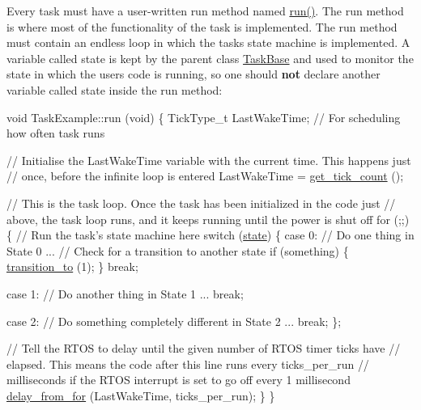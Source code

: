 Every task must have a user-\/written run method named {\ttfamily \mbox{\hyperlink{class_task_base_adcf6036ad9c860051ccf392ba5e7dbbc}{run()}}}. The run method is where most of the functionality of the task is implemented. The run method must contain an endless loop in which the task\textquotesingle{}s state machine is implemented. A variable called {\ttfamily state} is kept by the parent class {\ttfamily \mbox{\hyperlink{class_task_base}{Task\+Base}}} and used to monitor the state in which the user\textquotesingle{}s code is running, so one should {\bfseries not} declare another variable called {\ttfamily state} inside the run method\+: 
\begin{DoxyCode}
\textcolor{keywordtype}{void} TaskExample::run (\textcolor{keywordtype}{void})
\{
    TickType\_t LastWakeTime;                   \textcolor{comment}{// For scheduling how often task runs}

    \textcolor{comment}{// Initialise the LastWakeTime variable with the current time. This happens just}
    \textcolor{comment}{// once, before the infinite loop is entered}
       LastWakeTime = \mbox{\hyperlink{class_task_base_aea05d3d35f6cbda823ed4812b0951944}{get\_tick\_count}} ();

    \textcolor{comment}{// This is the task loop. Once the task has been initialized in the code just}
    \textcolor{comment}{// above, the task loop runs, and it keeps running until the power is shut off}
    \textcolor{keywordflow}{for} (;;)
    \{
        \textcolor{comment}{// Run the task's state machine here}
        \textcolor{keywordflow}{switch} (\mbox{\hyperlink{class_task_base_aab6866bbd5d036810829ccc7cd3ab0e8}{state}})
        \{
            \textcolor{keywordflow}{case} 0:
                \textcolor{comment}{// Do one thing in State 0}
                ...
                \textcolor{comment}{// Check for a transition to another state}
                \textcolor{keywordflow}{if} (something)
                \{
                    \mbox{\hyperlink{class_task_base_af70bf7c9cb6dfccdb1dbf41b7c6d2ecf}{transition\_to}} (1);
                \}
                \textcolor{keywordflow}{break};

            \textcolor{keywordflow}{case} 1:
                \textcolor{comment}{// Do another thing in State 1}
                ...
                \textcolor{keywordflow}{break};

            \textcolor{keywordflow}{case} 2:
                \textcolor{comment}{// Do something completely different in State 2}
                ...
                \textcolor{keywordflow}{break};
        \};

        \textcolor{comment}{// Tell the RTOS to delay until the given number of RTOS timer ticks have}
        \textcolor{comment}{// elapsed. This means the code after this line runs every ticks\_per\_run}
        \textcolor{comment}{// milliseconds if the RTOS interrupt is set to go off every 1 millisecond}
        \mbox{\hyperlink{class_task_base_adc48db72592a8b34ca1235e1d18604cc}{delay\_from\_for}} (LastWakeTime, ticks\_per\_run);
    \}
\}
\end{DoxyCode}


